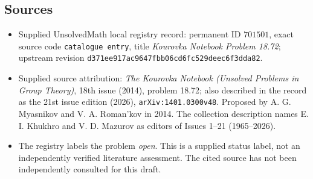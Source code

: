 \documentclass[11pt]{article}
\begin{document}
\subsection{Sources}
\begin{itemize}
\item Supplied UnsolvedMath local registry record: permanent ID \(701501\), exact source code \texttt{catalogue entry}, title \emph{Kourovka Notebook Problem 18.72}; upstream revision \texttt{d371ee917ac9647fbb06cd6fc529deec6f3dda82}.
\item Supplied source attribution: \emph{The Kourovka Notebook (Unsolved Problems in Group Theory)}, 18th issue (2014), problem 18.72; also described in the record as the 21st issue edition (2026), \texttt{arXiv:1401.0300v48}. Proposed by A. G. Myasnikov and V. A. Roman'kov in 2014. The collection description names E. I. Khukhro and V. D. Mazurov as editors of Issues 1--21 (1965--2026).
\item The registry labels the problem \emph{open}. This is a supplied status label, not an independently verified literature assessment. The cited source has not been independently consulted for this draft.
\end{itemize}
\end{document}
